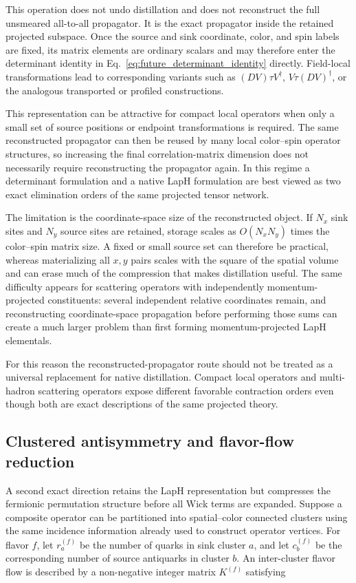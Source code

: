 This operation does not undo distillation and does not reconstruct the full
unsmeared all-to-all propagator. It is the exact propagator inside the retained
projected subspace. Once the source and sink coordinate, color, and spin labels
are fixed, its matrix elements are ordinary scalars and may therefore enter the
determinant identity in Eq.~\eqref{eq:future_determinant_identity} directly.
Field-local transformations lead to corresponding variants such as
\((D V)\tau V^\dagger\), \(V\tau(DV)^\dagger\), or the analogous transported or
profiled constructions.

This representation can be attractive for compact local operators when only a
small set of source positions or endpoint transformations is required. The
same reconstructed propagator can then be reused by many local color--spin
operator structures, so increasing the final correlation-matrix dimension does
not necessarily require reconstructing the propagator again. In this regime a
determinant formulation and a native LapH formulation are best viewed as two
exact elimination orders of the same projected tensor network.

The limitation is the coordinate-space size of the reconstructed object. If
\(N_x\) sink sites and \(N_y\) source sites are retained, storage scales as
\(O(N_xN_y)\) times the color--spin matrix size. A fixed or small source set can
therefore be practical, whereas materializing all \(x,y\) pairs scales with the
square of the spatial volume and can erase much of the compression that makes
distillation useful. The same difficulty appears for scattering operators
with independently momentum-projected constituents: several independent
relative coordinates remain, and reconstructing coordinate-space propagation
before performing those sums can create a much larger problem than first
forming momentum-projected LapH elementals.

For this reason the reconstructed-propagator route should not be treated as a
universal replacement for native distillation. Compact local operators and
multi-hadron scattering operators expose different favorable contraction
orders even though both are exact descriptions of the same projected theory.

\subsection{Clustered antisymmetry and flavor-flow reduction}
\label{subsec:future_flow_compression}

A second exact direction retains the LapH representation but compresses the
fermionic permutation structure before all Wick terms are expanded. Suppose a
composite operator can be partitioned into spatial--color connected clusters
using the same incidence information already used to construct operator
vertices. For flavor \(f\), let \(r_a^{(f)}\) be the number of quarks in sink
cluster \(a\), and let \(c_b^{(f)}\) be the corresponding number of source
antiquarks in cluster \(b\). An inter-cluster flavor flow is described by a
non-negative integer matrix \(K^{(f)}\) satisfying

